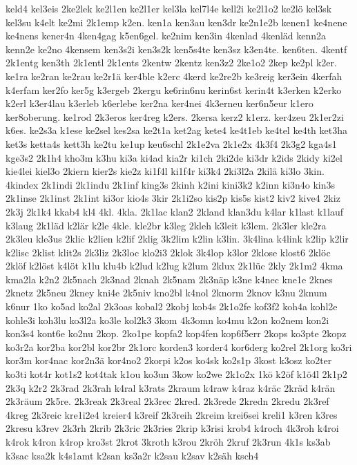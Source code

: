 {keld4
kel3eis
2ke2lek
ke2l1en
ke2l1er
kel3la
kel7l4e
kell2i
ke2l1o2
ke2lö
kel3sk
kel3su
k4elt
ke2mi
2k1emp
k2en.
ken1a
ken3au
ken3dr
ke2n1e2b
kenen1
ke4nene
ke4nens
kener4n
4ken4gag
k5en6gel.
ke2nim
ken3in
4kenlad
4kenläd
kenn2a
kenn2e
ke2no
4kensem
ken3s2i
ken3s2k
ken5s4te
ken3sz
k3en4te.
ken6ten.
4kentf
2k1entg
ken3th
2k1entl
2k1ents
2kentw
2kentz
ken3z2
2ke1o2
2kep
ke2pl
k2er.
ke1ra
ke2ran
ke2rau
ke2r1ä
ker4ble
k2erc
4kerd
ke2re2b
ke3reig
ker3ein
4kerfah
k4erfam
ker2fo
ker5g
k3ergeb
2kergu
ke6rin6nu
kerin6st
kerin4t
k3erken
k2erko
k2erl
k3er4lau
k3erleb
k6erlebe
ker2na
ker4nei
4k3erneu
ker6n5eur
k1ero
ker8oberung.
ke1rod
2k3eros
ker4reg
k2ers.
2kersa
kerz2
k1erz.
ker4zeu
2k1er2zi
k6es.
ke2s3a
k1ese
ke2sel
kes2sa
ke2t1a
ket2ag
kete4
ke4t1eb
ke4tel
ke4th
ket3ha
ket3s
ketta4s
kett3h
ke2tu
ke1up
keu6schl
2k1e2va
2k1e2x
4k3f4
2k3g2
kga4s1
kge3s2
2k1h4
kho3m
k3hu
ki3a
ki4ad
kia2r
ki1ch
2ki2de
ki3dr
k2ids
2kidy
ki2el
kie4lei
kiel3o
2kiern
kier2s
kie2z
ki1f4l
ki1f4r
ki3k4
2ki3l2a
2kilä
ki3lo
3kin.
4kindex
2k1indi
2k1indu
2k1inf
king3s
2kinh
k2ini
kini3k2
k2inn
ki3n4o
kin3s
2k1inse
2k1inst
2k1int
ki3or
kio4s
3kir
2k1i2so
kis2p
kis5s
kist2
kiv2
kive4
2kiz
2k3j
2k1k4
kkab4
kl4
4kl.
4kla.
2k1lac
klan2
2kland
klan3du
k4lar
k1last
k1lauf
k3laug
2k1läd
k2lär
k2le
4kle.
kle2br
k3leg
2kleh
k3leit
k3lem.
2k3ler
kle2ra
2k3leu
kle3us
2klic
k2lien
k2lif
2klig
3k2lim
k2lin
k3lin.
3k4lina
k4link
k2lip
k2lir
k2lisc
2klist
klit2s
2k3liz
2k3loc
klo2i3
2klok
3k4lop
k3lor
2klose
klost6
2klöc
2klöf
k2löst
k4löt
k1lu
klu4b
k2lud
k2lug
k2lum
2klux
2k1lüc
2kly
2k1m2
4kma
kma2la
k2n2
2k5nach
2k3nad
2knah
2k5nam
2k3näp
k3ne
k4nec
kne1e
2knes
2knetz
2k5neu
2kney
kni4e
2k5niv
kno2bl
k4nol
2knorm
2knov
k3nu
2knum
k6nur
1ko
ko5ad
ko2al
2k3oas
kobal2
2kobj
kob4s
2k1o2fe
kof3f2
koh4a
kohl2e
kohle3i
koh3lu
ko3l2a
ko3le
kol2k3
3kom
4k3omn
ko4mu
k2on
ko2nem
kon2i
kon3s4
kont6e
ko2nu
2kop.
2ko1pe
kopfa2
kop4fen
kop6f5err
2kops
ko3pte
2kopz
ko3r2a
kor2ba
kor2bl
kor2br
2k1orc
korden3
korder4
kor6derg
ko2rel
2k1org
ko3ri
kor3m
kor4nac
kor2n3ä
kor4no2
2korpi
k2os
ko4sk
ko2s1p
3kost
k3osz
ko2ter
ko3ti
kot4r
kot1s2
kot4tak
k1ou
ko3un
3kow
ko2we
2k1o2x
1kö
k2öf
k1ö4l
2k1p2
2k3q
k2r2
2k3rad
2k3rah
k4ral
k3rats
2kraum
k4raw
k4raz
k4räc
2kräd
k4rän
2k3räum
2k5re.
2k3reak
2k3real
2k3rec
2kred.
2k3rede
2kredn
2kredu
2k3ref
4kreg
2k3reic
kre1i2e4
kreier4
k3reif
2k3reih
2kreim
krei6sei
kreli1
k3ren
k3res
2kresu
k3rev
2k3rh
2krib
2k3ric
2k3ries
2krip
k3risi
krob4
k4roch
4k3roh
k4roi
k4rok
k4ron
k4rop
kro3st
2krot
3kroth
k3rou
2kröh
2kruf
2k3run
4k1s
ks3ab
k3sac
ksa2k
k4s1amt
k2san
ks3a2r
k2sau
k2sav
k2säh
ksch4
}
